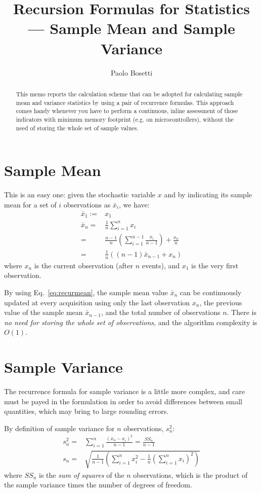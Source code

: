 \documentclass{article}
\title{Recursion Formulas for Statistics --- Sample Mean and Sample Variance}
\author{Paolo Bosetti}
\begin{document}
\maketitle

\begin{abstract}
  This memo reports the calculation scheme that can be adopted for
  calculating sample mean and variance statistics by using a pair of
  recurrence formulas. This approach comes handy whenever you have to
  perform a continuous, inline assessment of those indicators with
  minimum memory footprint (e.g. on microcontrollers), without the
  need of storing the whole set of sample values.
\end{abstract}

\newcommand{\inv}[1]{\frac{1}{#1}}
\section{Sample Mean}
This is an easy one: given the stochastic variable $x$ and by
indicating its sample mean for a set of $i$ observations as
$\bar x_i$, we have:
\begin{eqnarray}
  \bar x_1 :=& x_1 \\
  \bar x_n =& \inv{n}\sum_{i=1}^{n} x_i \\
  =& \frac{n-1}{n} \left(\sum_{i=1}^{n-1}\frac{x_i}{n-1}\right) + \frac{x_n}{n} \\
  =& \inv{n}\left((n-1) \bar x_{n-1} + x_n\right) \label{eq:recurmean}
\end{eqnarray}
where $x_n$ is the current observation (after $n$ events), and $x_1$
is the very first observation.

By using Eq.~\ref{eq:recurmean}, the sample mean value $\bar x_n$ can
be continuously updated at every acquisition using only the last
observation $x_n$, the previous value of the sample mean
$\bar x_{n-1}$, and the total number of observations $n$. There is
\emph{no need for storing the whole set of observations}, and the
algorithm complexity is $O(1)$.


\section{Sample Variance} %
\label{sec:sample_variance}
The recurrence formula for sample variance is a little more complex,
and care must be payed in the formulation in order to avoid
differences between small quantities, which may bring to large
rounding errors.

By definition of sample variance for $n$ observations, $s_n^2$:
\begin{align}
  s_n^2 =& \sum_{i=1}^{n}\frac{(\bar x_n - x_i)^2}{n-1} = \frac{SS_n}{n-1} \\
  s_n   =& \sqrt{\inv{n-1}\left(\sum_{i=1}^{n}x_i^2 - \inv{n}\left(\sum_{i=1}^{n} x_i\right)^2\right)}
\end{align}
where $SS_n$ is the \emph{sum of squares} of the $n$ observations,
which is the product of the sample variance times the number of
degrees of freedom.
\end{document}
